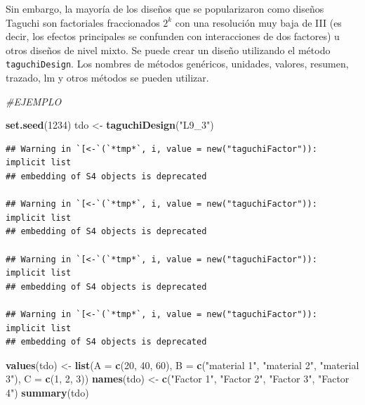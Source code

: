 \documentclass[
]{book}
\newenvironment{Shaded}{\begin{snugshade}}{\end{snugshade}}
\newcommand{\AttributeTok}[1]{\textcolor[rgb]{0.13,0.29,0.53}{#1}}
\newcommand{\CommentTok}[1]{\textcolor[rgb]{0.56,0.35,0.01}{\textit{#1}}}
\newcommand{\DecValTok}[1]{\textcolor[rgb]{0.00,0.00,0.81}{#1}}
\newcommand{\FunctionTok}[1]{\textcolor[rgb]{0.13,0.29,0.53}{\textbf{#1}}}
\newcommand{\NormalTok}[1]{#1}
\newcommand{\OtherTok}[1]{\textcolor[rgb]{0.56,0.35,0.01}{#1}}
\newcommand{\StringTok}[1]{\textcolor[rgb]{0.31,0.60,0.02}{#1}}
\begin{document}
Sin embargo, la mayoría de los diseños que se popularizaron como diseños Taguchi son factoriales fraccionados \(2^k\) con una resolución muy baja de III (es decir, los efectos principales se confunden con interacciones de dos factores) u otros diseños de nivel mixto.
Se puede crear un diseño utilizando el método \texttt{taguchiDesign}. Los nombres de métodos genéricos, unidades, valores, resumen, trazado, lm y otros métodos se pueden utilizar.

\begin{Shaded}
\begin{Highlighting}[]
\CommentTok{\#EJEMPLO}

\FunctionTok{set.seed}\NormalTok{(}\DecValTok{1234}\NormalTok{)}
\NormalTok{tdo }\OtherTok{\textless{}{-}} \FunctionTok{taguchiDesign}\NormalTok{(}\StringTok{"L9\_3"}\NormalTok{)}
\end{Highlighting}
\end{Shaded}

\begin{verbatim}
## Warning in `[<-`(`*tmp*`, i, value = new("taguchiFactor")): implicit list
## embedding of S4 objects is deprecated

## Warning in `[<-`(`*tmp*`, i, value = new("taguchiFactor")): implicit list
## embedding of S4 objects is deprecated

## Warning in `[<-`(`*tmp*`, i, value = new("taguchiFactor")): implicit list
## embedding of S4 objects is deprecated

## Warning in `[<-`(`*tmp*`, i, value = new("taguchiFactor")): implicit list
## embedding of S4 objects is deprecated
\end{verbatim}

\begin{Shaded}
\begin{Highlighting}[]
\FunctionTok{values}\NormalTok{(tdo) }\OtherTok{\textless{}{-}} \FunctionTok{list}\NormalTok{(}\AttributeTok{A =} \FunctionTok{c}\NormalTok{(}\DecValTok{20}\NormalTok{, }\DecValTok{40}\NormalTok{, }\DecValTok{60}\NormalTok{), }\AttributeTok{B =} \FunctionTok{c}\NormalTok{(}\StringTok{"material 1"}\NormalTok{, }\StringTok{"material 2"}\NormalTok{, }\StringTok{"material 3"}\NormalTok{), }\AttributeTok{C =} \FunctionTok{c}\NormalTok{(}\DecValTok{1}\NormalTok{, }\DecValTok{2}\NormalTok{, }\DecValTok{3}\NormalTok{))}
\FunctionTok{names}\NormalTok{(tdo) }\OtherTok{\textless{}{-}} \FunctionTok{c}\NormalTok{(}\StringTok{"Factor 1"}\NormalTok{, }\StringTok{"Factor 2"}\NormalTok{, }\StringTok{"Factor 3"}\NormalTok{, }\StringTok{"Factor 4"}\NormalTok{)}
\FunctionTok{summary}\NormalTok{(tdo)}
\end{Highlighting}
\end{Shaded}
\end{document}
